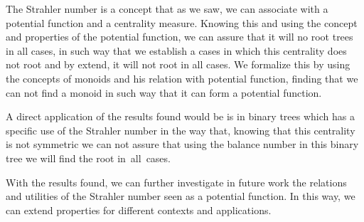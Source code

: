 
The Strahler number is a concept that as we saw, we can associate with a potential function and a centrality measure. Knowing this and using the concept and properties of the potential function, we can assure that it will no root trees in all cases, in such way that we establish a cases in which this centrality does not root and by extend, it will not root in all cases. We formalize this by using the concepts of monoids and his relation with potential function, finding that we can not find a monoid in such way that it can form a potential function.

A direct application of the results found would be is in binary trees which has a specific use of the Strahler number in the way that, knowing that this centrality is not symmetric we can not assure that using the balance number in this binary tree we will find the root in~all~cases.

With the results found, we can further investigate in future work the relations and utilities of the Strahler number seen as a potential function. In this way, we can extend properties for different contexts and applications.